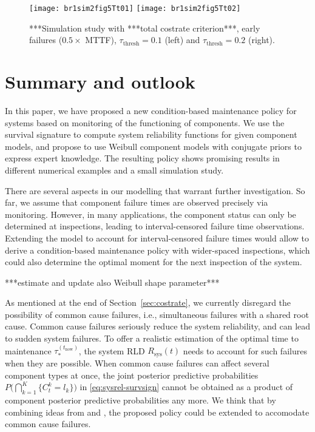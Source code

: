 \documentclass[authoryear]{elsarticle}
\newcommand{\Rsys}{R_\text{sys}}
\def\tnow{t_\text{now}}
\newcommand{\tausnow}{\tau_*^{(\tnow)}}
\newcommand{\tthresh}{\tau_{\text{thresh}}}
\begin{document}
\begin{figure}
\texttt{[image: br1sim2fig5Tt01]}
\texttt{[image: br1sim2fig5Tt02]}
\caption{***Simulation study with ***total costrate criterion***, early failures ($0.5 \times$ MTTF),
$\tthresh = 0.1$ (left) and $\tthresh = 0.2$ (right).}
\label{fig:simtotalcostrate0102}
\end{figure}
\fi


\section{Summary and outlook}
\label{sec:outlook}

In this paper, we have proposed a new condition-based maintenance policy
for systems based on monitoring of the functioning of components.
We use the survival signature to compute system reliability functions
for given component models, and propose to use Weibull component models
with conjugate priors to express expert knowledge.
The resulting policy shows promising results in
different numerical examples and a small simulation study.

There are several aspects in our modelling that warrant further investigation.
So far, we assume that component failure times are observed precisely via monitoring.
However, in many applications, the component status can only be determined
at inspections, leading to interval-censored failure time observations.
Extending the model to account for interval-censored failure times
would allow to derive a condition-based maintenance policy with wider-spaced inspections,
which could also determine the optimal moment for the next inspection of the system.

***estimate and update also Weibull shape parameter***

As mentioned at the end of Section~\ref{sec:costrate},
we currently disregard the possibility of common cause failures,
i.e., simultaneous failures with a shared root cause.
Common cause failures seriously reduce the system reliability,
and can lead to sudden system failures.
To offer a realistic estimation of the optimal time to maintenance $\tausnow$,
the system RLD $\Rsys(t)$ needs to account for such failures when they are possible.
When common cause failures can affect several component types at once,
the joint posterior predictive probabilities $P\Big( \bigcap_{k=1}^K \{ C^k_t = l_k\} \Big)$ in \eqref{eq:sysrel-survsign}
cannot be obtained as a product of component posterior predictive probabilities any more.
We think that by combining ideas from \cite{2015:coolen-coolen-maturi} and \cite{Troffaes2014a},
the proposed policy could be extended to accomodate common cause failures.
\end{document}
